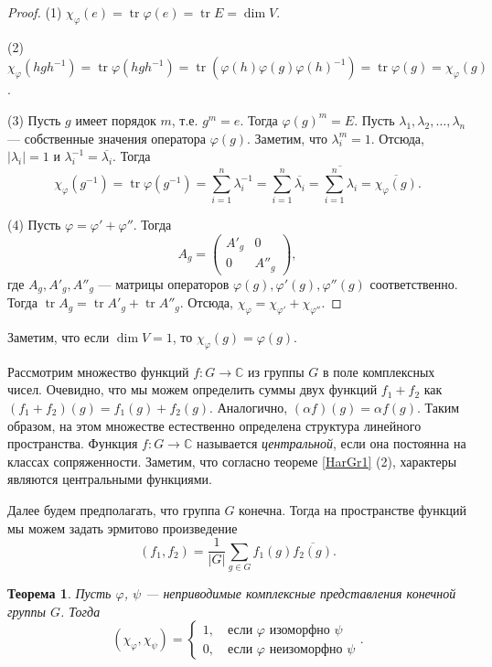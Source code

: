 \documentclass[12pt, titlepage, oneside]{amsbook}
\newcommand{\tr}{\operatorname{tr}}
\newcommand{\CC}{\mathbb{C}}
\newtheorem{theorem}{Теорема}[chapter]
\theoremstyle{definition}
\theoremstyle{remark}
\begin{document}
\begin{proof}
	(1) $\chi_{\varphi}(e)=\tr\varphi(e)=\tr E=\dim V$.
	
	(2) $\chi_{\varphi}(hgh^{-1})=\tr\varphi(hgh^{-1})=\tr(\varphi(h)\varphi(g)\varphi(h)^{-1})=\tr\varphi(g)=\chi_{\varphi}(g)$.
	
	(3) Пусть $g$ имеет порядок $m$, т.е. $g^m=e$. Тогда $\varphi(g)^m=E$. Пусть $\lambda_1,\lambda_2,\ldots,\lambda_n$ --- собственные значения оператора $\varphi(g)$. Заметим, что $\lambda_i^m=1$. Отсюда, $|\lambda_i|=1$ и $\lambda_i^{-1}=\overline{\lambda_i}$. Тогда $$\chi_{\varphi}(g^{-1})=\tr\varphi(g^{-1})=\sum\limits_{i=1}^n\lambda_i^{-1}=\sum\limits_{i=1}^n\overline{\lambda_i}=\overline{\sum\limits_{i=1}^n\lambda_i}=\overline{\chi_{\varphi}(g)}.$$
	
	(4) Пусть $\varphi=\varphi'+\varphi''$. Тогда $$A_g=\begin{pmatrix} A'_g & 0     \\
                0    & A''_g\end{pmatrix},$$ где $A_g,A'_g,A''_g$ --- матрицы операторов $\varphi(g),\varphi'(g),\varphi''(g)$ соответственно. Тогда $\tr A_g=\tr A'_g+\tr A''_g$. Отсюда, $\chi_{\varphi}=\chi_{\varphi'}+\chi_{\varphi''}$.
\end{proof}

Заметим, что если $\dim V=1$, то $\chi_{\varphi}(g)=\varphi(g)$.

Рассмотрим множество функций $f\colon G\rightarrow\CC$ из группы $G$ в поле комплексных чисел. Очевидно, что мы можем определить суммы двух функций $f_1+f_2$ как $(f_1+f_2)(g)=f_1(g)+f_2(g)$. Аналогично, $(\alpha f)(g)=\alpha f(g)$. Таким образом, на этом множестве естественно определена структура линейного пространства. Функция $f\colon G\rightarrow\CC$ называется \emph{центральной}, если она постоянна на классах сопряженности. Заметим, что согласно теореме \ref{HarGr1} (2), характеры являются центральными функциями.

Далее будем предполагать, что группа $G$ конечна. Тогда на пространстве функций мы можем задать эрмитово произведение $$(f_1,f_2)=\frac{1}{|G|}\sum\limits_{g\in G}f_1(g)\overline{f_2(g)}.$$

\begin{theorem}
	\label{HarGr2}
	Пусть $\varphi$, $\psi$ --- неприводимые комплексные представления конечной группы $G$. Тогда $$(\chi_{\varphi},\chi_{\psi})=\begin{cases} 1,\quad \text{если $\varphi$ изоморфно $\psi$} \\
			0,\quad \text{если $\varphi$ неизоморфно $\psi$}\end{cases}.$$
\end{theorem}
\end{document}
